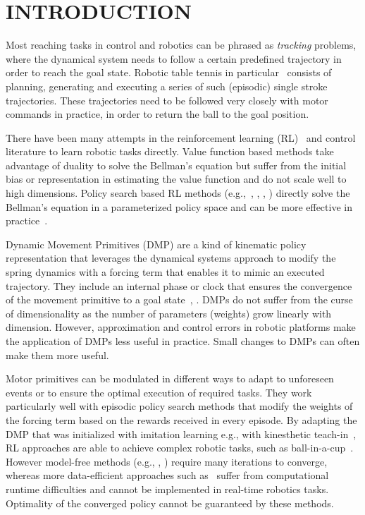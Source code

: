 \section{INTRODUCTION}\label{introduction}


Most reaching tasks in control and robotics can be phrased as \emph{tracking} problems, where the dynamical system needs to follow a certain predefined trajectory in order to reach the goal state. Robotic table tennis in particular~\cite{Muelling13} consists of planning, generating and executing a series of such (episodic) single stroke trajectories. These trajectories need to be followed very closely with motor commands in practice, in order to return the ball to the goal position. 

There have been many attempts in the reinforcement learning (RL)~\cite{Sutton98} and control literature to learn robotic tasks directly. Value function based methods take advantage of duality to solve the Bellman's equation but suffer from the initial bias or representation in estimating the value function and do not scale well to high dimensions. Policy search based RL methods (e.g.,~\cite{Kober08}, \cite{Peter10}, \cite{Theodorou10}, \cite{Deisenroth11}) directly solve the Bellman's equation in a parameterized policy space and can be more effective in practice~\cite{Kober13}. 

Dynamic Movement Primitives (DMP) are a kind of kinematic policy representation that leverages the dynamical systems approach to modify the spring dynamics with a forcing term that enables it to mimic an executed trajectory. They include an internal phase or clock that ensures the convergence of the movement primitive to a goal state~\cite{Ijspeert13}, \cite{Schaal07}. DMPs do not suffer from the curse of dimensionality as the number of parameters (weights) grow linearly with dimension. However, approximation and control errors in robotic platforms make the application of DMPs less useful in practice. Small changes to DMPs can often make them more useful.

Motor primitives can be modulated in different ways to adapt to unforeseen events or to ensure the optimal execution of required tasks. They work particularly well with episodic policy search methods that modify the weights of the forcing term based on the rewards received in every episode. By adapting the DMP that was initialized with imitation learning e.g., with kinesthetic teach-in~\cite{Muelling13}, RL approaches are able to achieve complex robotic tasks, such as ball-in-a-cup~\cite{Kober09}. However model-free methods (e.g., \cite{Kober08}, \cite{Peter10}) require many iterations to converge, whereas more data-efficient approaches such as~\cite{Deisenroth11} suffer from computational runtime difficulties and cannot be implemented in real-time robotics tasks. Optimality of the converged policy cannot be guaranteed by these methods.

